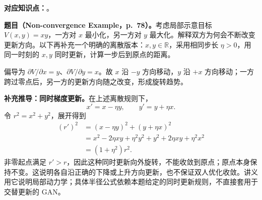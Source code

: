 
\textbf{对应知识点：}。

\textbf{题目（Non-convergence Example，p.~78）。}考虑局部示意目标 $V(x,y)=xy$，一方对 $x$ 最小化，另一方对 $y$ 最大化。解释双方为何会不断改变更新方向。以下再补充一个明确的离散版本：$x,y\in\mathbb R$，采用相同步长 $\eta>0$，用同一时刻的 $x,y$ 同时更新，计算一步后到原点的距离。

\begin{workedsolution}
偏导为 $\partial V/\partial x=y$、$\partial V/\partial y=x$。故 $x$ 沿 $-y$ 方向移动，$y$ 沿 $+x$ 方向移动；一方跨过零点后，另一方的更新方向随之改变，形成旋转趋势。

\textbf{补充推导：同时梯度更新。}在上述离散规则下，
\[
 x'=x-\eta y,\qquad y'=y+\eta x.
\]
令 $r^2=x^2+y^2$，展开得到
\[
 \begin{aligned}
 (r')^2
 &=(x-\eta y)^2+(y+\eta x)^2\\
 &=x^2-2\eta xy+\eta^2y^2+y^2+2\eta xy+\eta^2x^2\\
 &=(1+\eta^2)r^2.
 \end{aligned}
\]
非零起点满足 $r'>r$，因此这种同时更新向外旋转，不能收敛到原点；原点本身保持不变。这说明各自沿正确的下降或上升方向更新，也不保证双人优化收敛。讲义用它说明局部动力学；具体半径公式依赖本题给定的同时更新规则，不直接套用于交替更新的 GAN。
\end{workedsolution}
